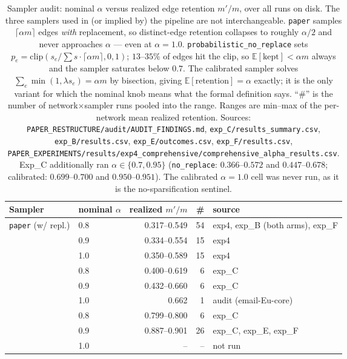 \begin{table}[t]
\centering
\setlength{\tabcolsep}{4pt}
\caption{Sampler audit: nominal $\alpha$ versus realized edge retention $m'/m$, over all runs on
disk. The three samplers used in (or implied by) the pipeline are not interchangeable.
\texttt{paper} samples $\lceil \alpha m\rceil$ edges \emph{with} replacement, so distinct-edge
retention collapses to roughly $\alpha/2$ and never approaches $\alpha$ --- even at $\alpha=1.0$.
\texttt{probabilistic\_no\_replace} sets $p_e=\mathrm{clip}(s_e/\sum s\cdot\lceil\alpha m\rceil,0,1)$;
$13$--$35\%$ of edges hit the clip, so $\mathbb{E}[\text{kept}]<\alpha m$ always and the sampler
saturates below $0.7$. The calibrated sampler solves $\sum_e \min(1,\lambda s_e)=\alpha m$ by
bisection, giving $\mathbb{E}[\text{retention}]=\alpha$ exactly; it is the only variant for which the
nominal knob means what the formal definition says. ``\#'' is the number of network$\times$sampler
runs pooled into the range. Ranges are min--max of the per-network mean realized retention.
Sources: \texttt{PAPER\_RESTRUCTURE/audit/AUDIT\_FINDINGS.md},
\texttt{exp\_C/results\_summary.csv}, \texttt{exp\_B/results.csv}, \texttt{exp\_E/outcomes.csv},
\texttt{exp\_F/results.csv},
\texttt{PAPER\_EXPERIMENTS/results/exp4\_comprehensive/comprehensive\_alpha\_results.csv}.
Exp\_C additionally ran $\alpha\in\{0.7,0.95\}$ (\texttt{no\_replace}: $0.366$--$0.572$ and
$0.447$--$0.678$; calibrated: $0.699$--$0.700$ and $0.950$--$0.951$). The calibrated
$\alpha=1.0$ cell was never run, as it is the no-sparsification sentinel.}
\label{tab:sampler_audit}
\footnotesize
\begin{tabular}{llrrl}
\toprule
Sampler & nominal $\alpha$ & realized $m'/m$ & \# & source \\
\midrule
\multirow{3}{*}{\texttt{paper} (w/ repl.)} & 0.8 & 0.317--0.549 & 54 & exp4, exp\_B (both arms), exp\_F \\
 & 0.9 & 0.334--0.554 & 15 & exp4 \\
 & 1.0 & 0.350--0.589 & 15 & exp4 \\
\addlinespace[2pt]
\multirow{3}{*}{\texttt{prob.\_no\_replace}} & 0.8 & 0.400--0.619 & 6 & exp\_C \\
 & 0.9 & 0.432--0.660 & 6 & exp\_C \\
 & 1.0 & 0.662 & 1 & audit (email-Eu-core) \\
\addlinespace[2pt]
\multirow{3}{*}{calibrated ($\lambda$-bisection)} & 0.8 & 0.799--0.800 & 6 & exp\_C \\
 & 0.9 & 0.887--0.901 & 26 & exp\_C, exp\_E, exp\_F \\
 & 1.0 & -- & -- & not run \\
\bottomrule
\end{tabular}
\end{table}
